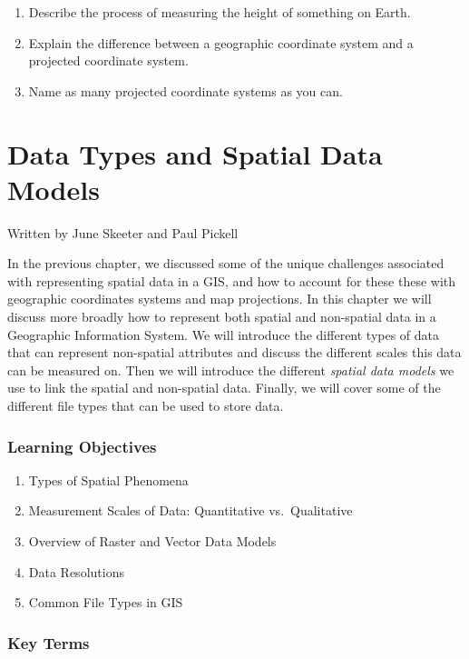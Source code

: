 \documentclass[
]{book}
\providecommand{\tightlist}{%
  \setlength{\itemsep}{0pt}\setlength{\parskip}{0pt}}
\begin{document}
\begin{enumerate}
\def\labelenumi{\arabic{enumi}.}
\tightlist
\item
  Describe the process of measuring the height of something on Earth.
\item
  Explain the difference between a geographic coordinate system and a projected coordinate system.
\item
  Name as many projected coordinate systems as you can.
\end{enumerate}

\chapter{Data Types and Spatial Data Models}\label{types-of-data}

Written by
June Skeeter and Paul Pickell

In the previous chapter, we discussed some of the unique challenges associated with representing spatial data in a GIS, and how to account for these these with geographic coordinates systems and map projections. In this chapter we will discuss more broadly how to represent both spatial and non-spatial data in a Geographic Information System. We will introduce the different types of data that can represent non-spatial attributes and discuss the different scales this data can be measured on. Then we will introduce the different \emph{spatial data models} we use to link the spatial and non-spatial data. Finally, we will cover some of the different file types that can be used to store data.

\subsection*{Learning Objectives}\label{learning-objectives-2}

\begin{enumerate}
\def\labelenumi{\arabic{enumi}.}
\tightlist
\item
  Types of Spatial Phenomena
\item
  Measurement Scales of Data: Quantitative vs.~Qualitative
\item
  Overview of Raster and Vector Data Models
\item
  Data Resolutions
\item
  Common File Types in GIS
\end{enumerate}

\subsection*{Key Terms}\label{key-terms-2}
\end{document}
